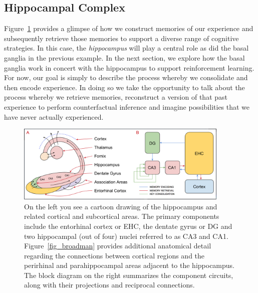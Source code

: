 \documentclass[letterpaper,11pt]{article}
\def\urlh#1{{}}
\begin{document}


\subsection{Hippocampal Complex}
\label{subsection_hippocampus}




Figure~{\urlh{#fig_Hippocampus_Anatomy_and_Physiology}{\ref{fig_hippo}}} provides a glimpse of how we construct memories of our experience and subsequently retrieve those memories to support a diverse range of cognitive strategies. In this case, the {\it{hippocampus}} will play a central role as did the basal ganglia in the previous example. In the next section, we explore how the basal ganglia work in concert with the hippocampus to support reinforcement learning. For now, our goal is simply to describe the process whereby we consolidate and then encode experience. In doing so we take the opportunity to talk about the process whereby we retrieve memories, reconstruct a version of that past experience to perform counterfactual inference and imagine possibilities that we have never actually experienced. 


\begin{figure}
%
  \begin{center}
    \includegraphics[width=4.0in]{./figures/Hippocampus_Anatomy_and_Physiology.jpg} %
  \end{center}
%
  \caption{On the left you see a cartoon drawing of the hippocampus and related cortical and subcortical areas. The primary components include the entorhinal cortex or EHC, the dentate gyrus or DG and two hippocampal (out of four) nuclei referred to as CA3 and CA1. Figure~\ref{fig_broadman} provides additional anatomical detail regarding the connections between cortical regions and the perirhinal and parahippocampal areas adjacent to the hippocampus. The block diagram on the right summarizes the component circuits, along with their projections and reciprocal connections.}
%
  \label{fig_hippo}
%
\end{figure}
\end{document}
